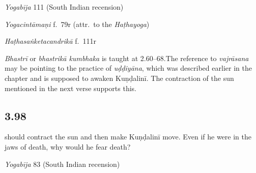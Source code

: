 \begin{ekdosis}

\begin{testimonia}[hp03_097]
\emph{Yogabīja} 111 (South Indian recension)
\begin{versinnote}
\end{versinnote}

\emph{Yogacintāmaṇi} f.~79r (attr.~to the \emph{Haṭhayoga})
\begin{versinnote}
\end{versinnote}

\emph{Haṭhasaṅketacandrikā} f.~111r
\begin{versinnote}
\end{versinnote}
\end{testimonia}

\begin{philcomm}[hp03_097]
\emph{Bhastrī} or \emph{bhastrikā kumbhaka} is taught at 2.60–68.The reference to \emph{vajrāsana} may be pointing to the practice of \emph{uḍḍiyāna}, which was described earlier in the chapter and is supposed to awaken Kuṇḍalinī. The contraction of the sun mentioned in the next verse supports this.
\end{philcomm}


\subsection*{3.98}
\begin{translation} should contract the sun and then make Kuṇḍalinī move. Even if he were in the jaws of death, why would he fear death?%
\end{translation}


\begin{testimonia}[hp03_098]
\emph{Yogabīja} 83 (South Indian recension)
\begin{versinnote}
\tl{\var{mṛtyuvartma° ] mṛtyuvaktra°,  mṛtyuvajra°, mṛtyupadma° \vl}\\!}
\end{versinnote}


\end{testimonia}
\end{ekdosis}
